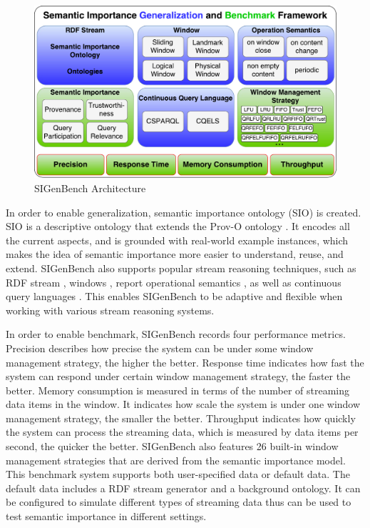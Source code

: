 \begin{figure}[!htbp]
	\centering
    \includegraphics[width=5in]{img/6-sib.pdf}
    \caption{SIGenBench Architecture}
    \label{fig:6-sib}
\end{figure}

In order to enable generalization, semantic importance ontology (SIO) is created.
SIO is a descriptive ontology that extends the Prov-O ontology \cite{lebo2013prov}. 
It encodes all the current aspects, and is grounded with real-world example instances, which makes the idea of semantic importance more easier to understand, reuse, and extend. 
SIGenBench also supports popular stream reasoning techniques, such as RDF stream \cite{della2009s}, windows \cite{patroumpas2006window}, report operational semantics \cite{botan2010secret}, as well as continuous query languages \cite{le2011native} \cite{barbieri2009c}.
This enables SIGenBench to be adaptive and flexible when working with various stream reasoning systems. 

In order to enable benchmark, SIGenBench records four performance metrics.
Precision describes how precise the system can be under some window management strategy, the higher the better.
Response time indicates how fast the system can respond under certain window management strategy, the faster the better. 
Memory consumption is measured in terms of the number of streaming data items in the window.
It indicates how scale the system is under one window management strategy, the smaller the better.
Throughput indicates how quickly the system can process the streaming data, which is measured by data items per second, the quicker the better. 
SIGenBench also features 26 built-in window management strategies that are derived from the semantic importance model. 
This benchmark system supports both user-specified data or default data. 
The default data includes a RDF stream generator and a background ontology.
It can be configured to simulate different types of streaming data thus can be used to test semantic importance in different settings. 
%
